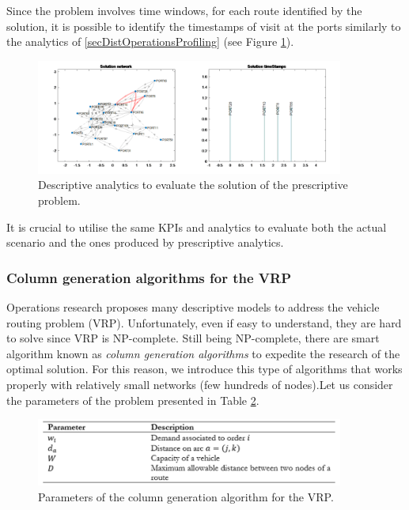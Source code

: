Since the problem involves time windows, for each route identified by the solution, it is possible to identify the timestamps of visit at the ports similarly to the analytics of \ref{secDistOperationsProfiling} (see Figure \ref{fig_vesselInventory}). 

\begin{figure}[hbt!]
\centering
\includegraphics[width=0.9\textwidth]{SectionDistribution/control_figures/fig_vesselInventory.png}
\captionsetup{type=figure}
\caption{Descriptive analytics to evaluate the solution of the prescriptive problem.}
\label{fig_vesselInventory}
\end{figure}

It is crucial to utilise the same KPIs and analytics to evaluate both the actual scenario and the ones produced by prescriptive analytics.

\subsubsection{Column generation algorithms for the VRP}

Operations research proposes many descriptive models to address the vehicle routing problem (VRP). Unfortunately, even if easy to understand, they are hard to solve since VRP is NP-complete. Still being NP-complete, there are smart algorithm known as \textit{column generation algorithms} to expedite the research of the optimal solution. For this reason, we introduce this type of algorithms that works properly with relatively small networks (few hundreds of nodes).Let us consider the parameters of the problem presented in Table \ref{tab_VRP_colgen}.

\begin{figure}[hbt!]
\centering
\includegraphics[width=0.9\textwidth]{SectionDistribution/control_figures/tab_VRP_colgen.png}
\captionsetup{type=table}
\caption{Parameters of the column generation algorithm for the VRP.}
\label{tab_VRP_colgen}
\end{figure}

